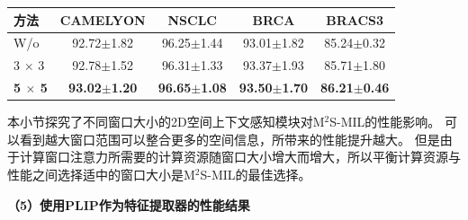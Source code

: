 \begin{table}[h!]
  \large    %
  \centering
  \begin{tabularx}{\textwidth}{lCCCC}
    \toprule
    方法 & CAMELYON& NSCLC&BRCA&BRACS3\\ \midrule
    W/o  & 92.72$\pm$1.82 &  96.25$\pm$1.44 & 93.01$\pm$1.82 &  85.24$\pm$0.32\\
    3 $\times$ 3  &  92.78$\pm$1.52 & 96.31$\pm$1.33 & 93.37$\pm$1.93 & 85.71$\pm$1.80\\
  \textbf{5 $\times$ 5} &\textbf{93.02$\pm$1.20} &\textbf{96.65$\pm$1.08}  &\textbf{93.50$\pm$1.70} & \textbf{86.21$\pm$0.46}\\
    \bottomrule
  \end{tabularx}
  \label{table3: size of window}
\end{table}

本小节探究了不同窗口大小的2D空间上下文感知模块对M$^2$S-MIL的性能影响。
可以看到越大窗口范围可以整合更多的空间信息，所带来的性能提升越大。
但是由于计算窗口注意力所需要的计算资源随窗口大小增大而增大，所以平衡计算资源与性能之间选择适中的窗口大小是M$^2$S-MIL的最佳选择。

\textbf{（5）使用PLIP作为特征提取器的性能结果}

